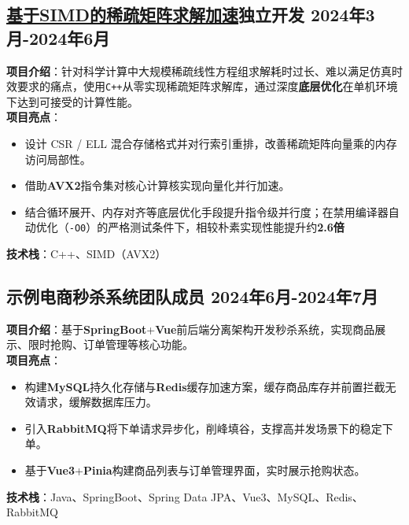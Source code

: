 \documentclass{customResume}
\begin{document}
\subsection{\texorpdfstring{\href{https://github.com/zhangsan/sparse-solver}{\textcolor{themeColor}{基于SIMD的稀疏矩阵求解加速\quad \faGithub}}\hfill \textnormal{独立开发} \hfill \textnormal{2024年3月-2024年6月}}{基于SIMD的稀疏矩阵求解加速}}
\textbf{项目介绍}：针对科学计算中大规模稀疏线性方程组求解耗时过长、难以满足仿真时效要求的痛点，使用\texttt{C++}从零实现稀疏矩阵求解库，通过深度\textbf{底层优化}在单机环境下达到可接受的计算性能。 \\
\textbf{项目亮点}：
\begin{itemize}
    \item 设计 CSR / ELL 混合存储格式并对行索引重排，改善稀疏矩阵向量乘的内存访问局部性。
    \item 借助\textbf{AVX2}指令集对核心计算核实现向量化并行加速。
    \item 结合循环展开、内存对齐等底层优化手段提升指令级并行度；在禁用编译器自动优化（\texttt{-O0}）的严格测试条件下，相较朴素实现性能提升约\textbf{2.6倍}
\end{itemize}
\textbf{技术栈}：C++、SIMD（AVX2）

\subsection{\texorpdfstring{示例电商秒杀系统\hfill \textnormal{团队成员} \hfill \textnormal{2024年6月-2024年7月}}{示例电商秒杀系统}}
\textbf{项目介绍}：基于\textbf{SpringBoot}+\textbf{Vue}前后端分离架构开发秒杀系统，实现商品展示、限时抢购、订单管理等核心功能。 \\
\textbf{项目亮点}：
\begin{itemize}
    \item 构建\textbf{MySQL}持久化存储与\textbf{Redis}缓存加速方案，缓存商品库存并前置拦截无效请求，缓解数据库压力。
    \item 引入\textbf{RabbitMQ}将下单请求异步化，削峰填谷，支撑高并发场景下的稳定下单。
    \item 基于\textbf{Vue3}+\textbf{Pinia}构建商品列表与订单管理界面，实时展示抢购状态。
\end{itemize}
\textbf{技术栈}：Java、SpringBoot、Spring Data JPA、Vue3、MySQL、Redis、RabbitMQ

\section{}
\end{document}
